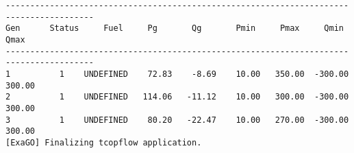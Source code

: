 \begin{lstlisting}
----------------------------------------------------------------------------------------
Gen      Status     Fuel     Pg       Qg       Pmin     Pmax     Qmin     Qmax  
----------------------------------------------------------------------------------------
1          1    UNDEFINED    72.83    -8.69    10.00   350.00  -300.00   300.00
2          1    UNDEFINED   114.06   -11.12    10.00   300.00  -300.00   300.00
3          1    UNDEFINED    80.20   -22.47    10.00   270.00  -300.00   300.00
[ExaGO] Finalizing tcopflow application.
\end{lstlisting}
